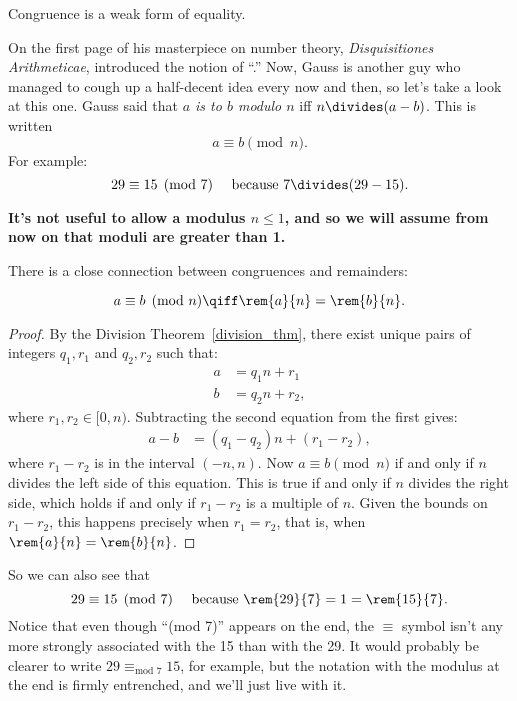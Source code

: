 \begin{editingnotes}
Congruence is a weak form of equality.
\end{editingnotes}

On the first page of his masterpiece on number theory,
\emph{Disquisitiones Arithmeticae},  introduced the notion
of ``.''  Now, Gauss is another guy who managed to
cough up a half-decent idea every now and then, so let's take a look
at this one.  Gauss said that \emph{$a$ is  to $b$
  modulo $n$}  iff $n \divides (a - b)$.
This is written 
\[
a \equiv b \pmod{n}.
\]
For example:
\[
29 \equiv 15 \pmod{7} \quad\text{ because } 7 \divides (29 - 15).
\]

\textbf{It's not useful to allow a modulus $n \leq 1$, and so we will
  assume from now on that moduli are greater than 1.}

There is a close connection between congruences and remainders:
\begin{lemma}[Remainder]\label{lem:conrem}
\[
a \equiv b \pmod{n} \qiff \rem{a}{n} = \rem{b}{n}.
\]
\end{lemma}

\begin{proof}
By the Division Theorem~\ref{division_thm}, there exist unique pairs
of integers $q_1, r_1$ and $q_2, r_2$ such that:
\begin{align*}
a & = q_1 n + r_1\\
b & = q_2 n + r_2,
\end{align*}
where $r_1,r_2 \in [0,n)$.  Subtracting the second equation from the
  first gives:
\begin{align*}
a - b & = (q_1 - q_2) n + (r_1 - r_2),
\end{align*}
where $r_1 - r_2$ is in the interval $(-n,n)$.  Now $a \equiv b
\pmod{n}$ if and only if $n$ divides the left side of this equation.
This is true if and only if $n$ divides the right side, which holds if
and only if $r_1 - r_2$ is a multiple of $n$.  Given the bounds on
$r_1 - r_2$, this happens precisely when $r_1 = r_2$, that is, when
$\rem{a}{n} = \rem{b}{n}$.
\end{proof}

So we can also see that
\[
29 \equiv 15 \pmod{7} \quad\text{ because } \rem{29}{7} = 1 =
\rem{15}{7}.
\]
Notice that even though ``(mod 7)'' appears on the end, the $\equiv$
symbol isn't any more strongly associated with the 15 than with the
29.  It would probably be clearer to write $29 \equiv_{\text{mod } 7}
15$, for example, but the notation with the modulus at the end is
firmly entrenched, and we'll just live with it.

